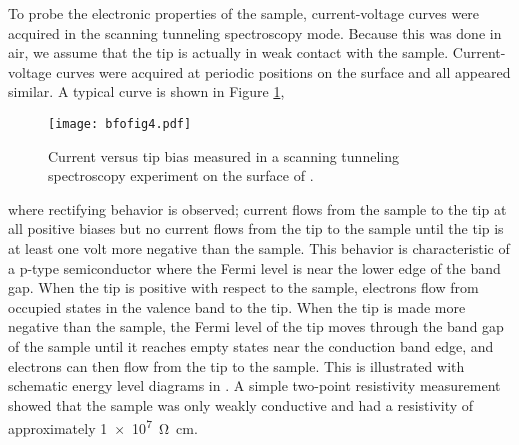 To probe the electronic properties of the sample, current-voltage curves were acquired in the scanning tunneling spectroscopy mode. Because this was done in air, we assume that the tip is actually in weak contact with the sample. Current-voltage curves were acquired at periodic positions on the surface and all appeared similar. A typical curve is shown in Figure \ref{fig:bfofig4},
\begin{figure}
\begin{center}
	\texttt{[image: bfofig4.pdf]}
		\caption[Scanning tunneling spectroscopy measurement of ]{%
			Current versus tip bias measured in a scanning tunneling spectroscopy 
	experiment on the surface of .}
	\label{fig:bfofig4}
\end{center}
\end{figure}
where rectifying behavior is observed; current flows from the sample to the tip at all positive biases but no current flows from the tip to the sample until the tip is at least one volt more negative than the sample. This behavior is characteristic of a p-type semiconductor where the Fermi level is near the lower edge of the band gap. When the tip is positive with respect to the sample, electrons flow from occupied states in the valence band to the tip. When the tip is made more negative than the sample, the Fermi level of the tip moves through the band gap of the sample until it reaches empty states near the conduction band edge, and electrons can then flow from the tip to the sample. This is illustrated with schematic energy level diagrams in . A simple two-point resistivity measurement showed that the sample was only weakly conductive and had a resistivity of approximately \SI{1e7}{\ohm\centi\meter}.
